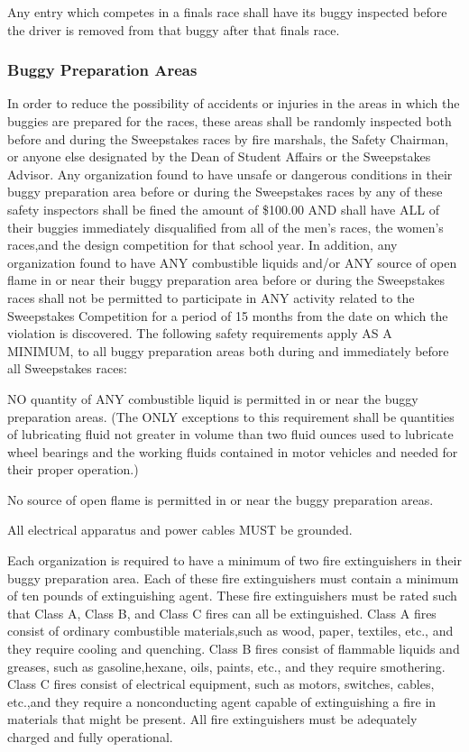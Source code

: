Any entry which competes in a finals race shall have its buggy inspected before the driver is removed from that buggy after that finals race.

\subsubsection{Buggy Preparation Areas}

In order to reduce the possibility of accidents or injuries in the areas in which the buggies are prepared for the races, these areas shall be randomly inspected both before and during the Sweepstakes races by fire marshals, the Safety Chairman, or anyone else designated by the Dean of Student Affairs or the Sweepstakes Advisor. Any organization found to have unsafe or dangerous conditions in their buggy preparation area before or during the Sweepstakes races by any of these safety inspectors shall be fined the amount of \$100.00 AND shall have ALL of their buggies immediately disqualified from all of the men's races, the women's races,and the design competition for that school year. In addition, any organization found to have ANY combustible liquids and/or ANY source of open flame in or near their buggy preparation area before or during the Sweepstakes races shall not be permitted to participate in ANY activity related to the Sweepstakes Competition for a period of 15 months from the date on which the violation is discovered. The following safety requirements apply AS A MINIMUM, to all buggy preparation areas both during and immediately before all Sweepstakes races:

NO quantity of ANY combustible liquid is permitted in or near the buggy preparation areas. (The ONLY exceptions to this requirement shall be quantities of lubricating fluid not greater in volume than two fluid ounces used to lubricate wheel bearings and the working fluids contained in motor vehicles and needed for their proper operation.)

No source of open flame is permitted in or near the buggy preparation areas.

All electrical apparatus and power cables MUST be grounded.

Each organization is required to have a minimum of two fire extinguishers in their buggy preparation area. Each of these fire extinguishers must contain a minimum of ten pounds of extinguishing agent. These fire extinguishers must be rated such that Class A, Class B, and Class C fires can all be extinguished. Class A fires consist of ordinary combustible materials,such as wood, paper, textiles, etc., and they require cooling and quenching. Class B fires consist of flammable liquids and greases, such as gasoline,hexane, oils, paints, etc., and they require smothering. Class C fires consist of electrical equipment, such as motors, switches, cables, etc.,and they require a nonconducting agent capable of extinguishing a fire in materials that might be present. All fire extinguishers must be adequately charged and fully operational.

